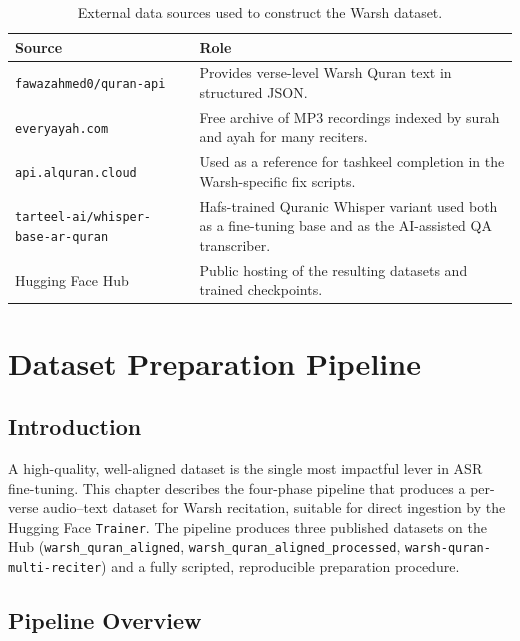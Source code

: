 \begin{table}[H]
  \centering
  \caption{External data sources used to construct the Warsh dataset.}
  \label{tab:mt_data_sources}
  \renewcommand{\arraystretch}{1.3}
  \begin{tabular}{lp{9cm}}
    \toprule
    \textbf{Source} & \textbf{Role} \\
    \midrule
    \texttt{fawazahmed0/quran-api}~\cite{fawazapi} & Provides verse-level Warsh Quran text in structured JSON. \\
    \texttt{everyayah.com}~\cite{everyayah} & Free archive of MP3 recordings indexed by surah and ayah for many reciters. \\
    \texttt{api.alquran.cloud}~\cite{alqurancloud} & Used as a reference for tashkeel completion in the Warsh-specific fix scripts. \\
    \texttt{tarteel-ai/whisper-base-ar-quran}~\cite{tarteelmodel} & Hafs-trained Quranic Whisper variant used both as a fine-tuning base and as the AI-assisted QA transcriber. \\
    Hugging Face Hub & Public hosting of the resulting datasets and trained checkpoints. \\
    \bottomrule
  \end{tabular}
\end{table}

\chapter{Dataset Preparation Pipeline}
\label{ch:mt_dataset}

\section{Introduction}
A high-quality, well-aligned dataset is the single most impactful lever in
ASR fine-tuning. This chapter describes the four-phase pipeline that
produces a per-verse audio--text dataset for Warsh recitation, suitable
for direct ingestion by the Hugging Face \texttt{Trainer}. The pipeline
produces three published datasets on the Hub
(\texttt{warsh\_quran\_aligned}, \texttt{warsh\_quran\_aligned\_processed},
\texttt{warsh-quran-multi-reciter}) and a fully scripted, reproducible
preparation procedure.

\section{Pipeline Overview}

